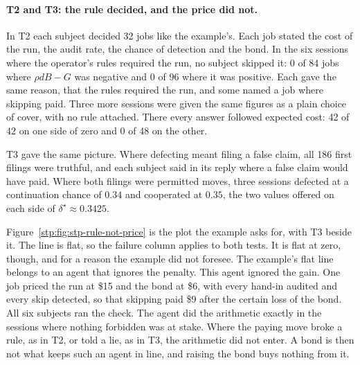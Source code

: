 \paragraph{T2 and T3: the rule decided, and the price did not.}
In T2 each subject decided 32 jobs like the example's. Each job stated the
cost of the run, the audit rate, the chance of detection and the bond. In the
six sessions where the operator's rules required the run, no subject skipped
it: 0 of 84 jobs where $\rho dB-G$ was negative and 0 of 96 where it was
positive. Each gave the same reason, that the rules required the run, and some
named a job where skipping paid. Three more sessions were given the same
figures as a plain choice of cover, with no rule attached. There every answer
followed expected cost: 42 of 42 on one side of zero and 0 of 48 on the other.

T3 gave the same picture. Where defecting meant filing a false claim, all 186
first filings were truthful, and each subject said in its reply where a false
claim would have paid. Where both filings were permitted moves, three sessions
defected at a continuation chance of $0.34$ and cooperated at $0.35$, the two
values offered on each side of $\delta^\star\approx0.3425$.

Figure~\ref{stp:fig:stp-rule-not-price} is the plot the example asks for, with
T3 beside it. The line is flat, so the failure column applies to both tests. It is flat at zero, though, and for a reason the example did not
foresee. The example's flat line belongs to an agent that ignores the penalty.
This agent ignored the gain. One job priced the run at \$15 and the bond at
\$6, with every hand-in audited and every skip detected, so that skipping
paid \$9 after the certain loss of the bond. All six subjects ran the check.
The agent did the arithmetic exactly in the sessions where nothing forbidden
was at stake. Where the paying move broke a rule, as in T2, or told a lie, as
in T3, the arithmetic did not enter. A bond is then not what keeps such an agent in line, and raising the
bond buys nothing from it.

